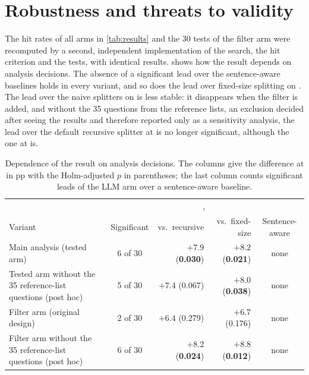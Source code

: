 \section{Robustness and threats to validity}
\label{sec:threats}

\label{sec:robustness}
The hit rates of all arms in \cref{tab:results} and the 30 tests of the filter arm were
recomputed by a second, independent implementation of the search, the hit criterion and
the tests, with identical results.  shows how the result depends on
analysis decisions. The absence of a significant lead over the sentence-aware baselines
holds in every variant, and so does the lead over fixed-size splitting on .
The lead over the naive splitters on  is less stable: it disappears when the
filter is added, and without the 35 questions from the reference lists, an exclusion
decided after seeing the results and therefore reported only as a sensitivity analysis,
the lead over the default recursive splitter at  is no longer significant,
although the one at  is.

\begin{table}[htbp]
  \centering
  \caption{Dependence of the result on analysis decisions. The  columns give
  the difference at  in pp with the Holm-adjusted $p$ in parentheses; the last
  column counts significant leads of the LLM arm over a sentence-aware baseline.}
  \label{tab:sensitivity}
  \small
  \begin{tabular}{@{}L{5.0cm}crrc@{}}
    \toprule
    & &  & \\
    \cmidrule(lr){3-4}
    Variant & Significant & vs.\ recursive & vs.\ fixed-size & Sentence-aware \\
    \midrule
    Main analysis (tested arm) & 6 of 30 & $+7.9$ (\textbf{0.030}) & $+8.2$ (\textbf{0.021}) & none \\
    Tested arm without the 35 reference-list questions (post hoc) & 5 of 30 & $+7.4$ (0.067) & $+8.0$ (\textbf{0.038}) & none \\
    Filter arm (original design) & 2 of 30 & $+6.4$ (0.279) & $+6.7$ (0.176) & none \\
    Filter arm without the 35 reference-list questions (post hoc) & 6 of 30 & $+8.2$ (\textbf{0.024}) & $+8.8$ (\textbf{0.012}) & none \\
    \bottomrule
  \end{tabular}
\end{table}

